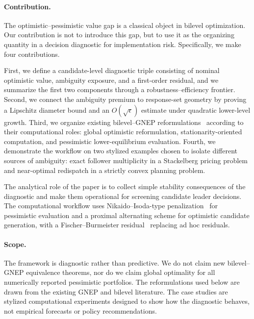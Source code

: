 \documentclass[11pt]{article}
\theoremstyle{definition}
\newcommand{\eps}{\epsilon}
\begin{document}
\paragraph{Contribution.}
The optimistic--pessimistic value gap is a classical object in
bilevel optimization. Our contribution is not to introduce this
gap, but to use it as the organizing quantity in a decision
diagnostic for implementation risk. Specifically, we make four
contributions.

First, we define a candidate-level diagnostic triple consisting of
nominal optimistic value, ambiguity exposure, and a first-order
residual, and we summarize the first two components through a
robustness--efficiency frontier. Second, we connect the ambiguity
premium to response-set geometry by proving a Lipschitz diameter
bound and an $O(\sqrt{\eps})$ estimate under quadratic lower-level
growth. Third, we organize existing bilevel--GNEP
reformulations~\cite{facchinei2010generalized,lampariello2017bridge,
lampariello2020numerically,lampariello2019standard} according to their
computational roles: global optimistic reformulation,
stationarity-oriented computation, and pessimistic
lower-equilibrium evaluation. Fourth, we demonstrate the workflow
on two stylized examples chosen to isolate different sources of
ambiguity: exact follower multiplicity in a Stackelberg pricing
problem and near-optimal redispatch in a strictly convex planning
problem.

The analytical role of the paper is to collect simple stability
consequences of the diagnostic and make them operational for
screening candidate leader decisions. The computational workflow
uses Nikaido--Isoda-type penalization~\cite{nikaido1955note,fukushima1992equivalent}
for pessimistic evaluation and a proximal alternating scheme for
optimistic candidate generation, with a Fischer--Burmeister
residual~\cite{fischer1992special,facchinei2003finite} replacing ad hoc
residuals.

\paragraph{Scope.}
The framework is diagnostic rather than predictive. We do not
claim new bilevel--GNEP equivalence theorems, nor do we claim
global optimality for all numerically reported pessimistic
portfolios. The reformulations used below are drawn from the
existing GNEP and bilevel literature. The case studies are
stylized computational experiments designed to show how the
diagnostic behaves, not empirical forecasts or policy
recommendations.
\end{document}
